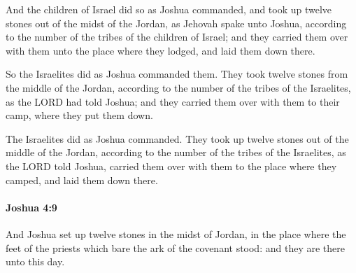 			\begin{versebox}
					\item[BHS] 
					\item[ASV] And the children of Israel did so as Joshua commanded, and took up twelve stones out of the midst of the Jordan, as Jehovah spake unto Joshua, according to the number of the tribes of the children of Israel; and they carried them over with them unto the place where they lodged, and laid them down there.
					\item[NIV] So the Israelites did as Joshua commanded them. They took twelve stones from the middle of the Jordan, according to the number of the tribes of the Israelites, as the LORD had told Joshua; and they carried them over with them to their camp, where they put them down.
					\item[NRSV] The Israelites did as Joshua commanded. They took up twelve stones out of the middle of the Jordan, according to the number of the tribes of the Israelites, as the LORD told Joshua, carried them over with them to the place where they camped, and laid them down there.
			\end{versebox}

		\paragraph{Joshua 4:9} %
			\label{JOSHUA-4-9}

			And Joshua set up twelve stones in the midst of Jordan, in the place where the feet of the priests which bare the ark of the covenant stood: and they are there unto this day.

